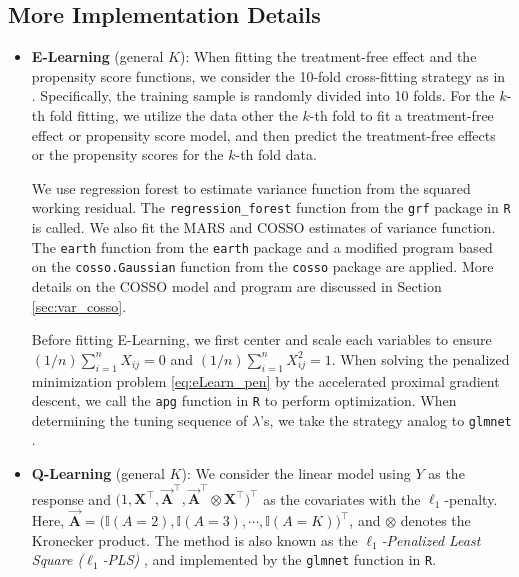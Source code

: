 \documentclass[11pt]{article}
\numberwithin{equation}{section}
\theoremstyle{definition}
\theoremstyle{remark}
\newcommand{\bA}{\bm{A}}
\newcommand{\bX}{\bm{X}}
\newcommand{\bbI}{\mathbb{I}}
\newcommand{\bbone}{\bbI}	%
\begin{document}
\subsection{More Implementation Details}\label{sec:implement_detail}
\begin{itemize}[leftmargin=*]
	\item \textbf{E-Learning} (general $ K $): When fitting the treatment-free effect and the propensity score functions, we consider the 10-fold cross-fitting strategy as in \citet{chernozhukov2018double,zhao2019efficient,athey2021policy}. Specifically, the training sample is randomly divided into 10 folds. For the $ k $-th fold fitting, we utilize the data other the $ k $-th fold to fit a treatment-free effect or propensity score model, and then predict the treatment-free effects or the propensity scores for the $ k $-th fold data. 
	
	We use regression forest to estimate variance function from the squared working residual. The \texttt{regression\_forest} function from the \texttt{grf} package in \texttt{R} is called. We also fit the MARS and COSSO estimates of variance function. The \texttt{earth} function from the \texttt{earth} package and a modified program based on the \texttt{cosso.Gaussian} function from the \texttt{cosso} package are applied. More details on the COSSO model and program are discussed in Section \ref{sec:var_cosso}.
	
	Before fitting E-Learning, we first center and scale each variables to ensure $ (1/n)\sum_{i=1}^{n}X_{ij} = 0 $ and $ (1/n)\sum_{i=1}^{n}X_{ij}^{2} = 1 $. When solving the penalized minimization problem \eqref{eq:eLearn_pen} by the accelerated proximal gradient descent, we call the \texttt{apg} function in \texttt{R} to perform optimization. When determining the tuning sequence of $ \lambda $'s, we take the strategy analog to \texttt{glmnet} \citep{friedman2010regularization}.
	
	\item \textbf{Q-Learning} (general $ K $): We consider the linear model using $ Y $ as the response and $ \big( 1,\bX^{\intercal},\vec{\bA}^{\intercal}, \vec{\bA}^{\intercal} \otimes \bX^{\intercal} \big)^{\intercal} $ as the covariates with the $ \ell_{1} $-penalty. Here, $ \vec{\bA} = \big( \bbone(A=2),\bbone(A=3),\cdots,\bbone(A=K) \big)^{\intercal} $, and $ \otimes $ denotes the Kronecker product. The method is also known as the \textit{$ \ell_{1} $-Penalized Least Square ($ \ell_{1} $-PLS)} \citep{qian2011performance}, and implemented by the \texttt{glmnet} function in \texttt{R}.
	

\end{itemize}
\end{document}
